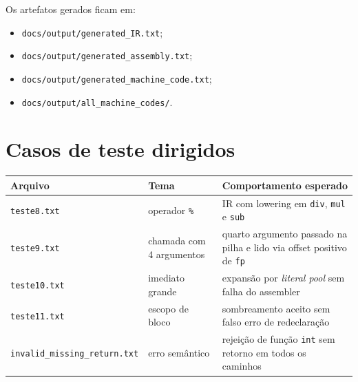 \documentclass[12pt,a4paper]{article}
\begin{document}
Os artefatos gerados ficam em:
\begin{itemize}[leftmargin=1.5em]
    \item \texttt{docs/output/generated\_IR.txt};
    \item \texttt{docs/output/generated\_assembly.txt};
    \item \texttt{docs/output/generated\_machine\_code.txt};
    \item \texttt{docs/output/all\_machine\_codes/}.
\end{itemize}

\section{Casos de teste dirigidos}
\begin{longtable}{>{\raggedright\arraybackslash}p{} >{\raggedright\arraybackslash}p{} >{\raggedright\arraybackslash}p{}}
\toprule
\textbf{Arquivo} & \textbf{Tema} & \textbf{Comportamento esperado} \\
\midrule
\endhead
\texttt{teste8.txt} & operador \texttt{\%} & IR com lowering em \texttt{div}, \texttt{mul} e \texttt{sub} \\
\texttt{teste9.txt} & chamada com 4 argumentos & quarto argumento passado na pilha e lido via offset positivo de \texttt{fp} \\
\texttt{teste10.txt} & imediato grande & expansão por \emph{literal pool} sem falha do assembler \\
\texttt{teste11.txt} & escopo de bloco & sombreamento aceito sem falso erro de redeclaração \\
\texttt{invalid\_missing\_return.txt} & erro semântico & rejeição de função \texttt{int} sem retorno em todos os caminhos \\
\bottomrule
\end{longtable}
\end{document}
